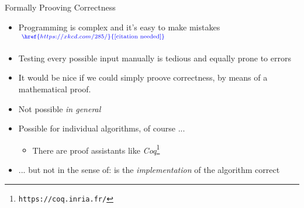 
\begin{frame}[fragile]{Formally Prooving Correctness}
%
\begin{itemize}
\item Programming is complex and it's easy to make mistakes$\phantom{.}^{\color{blue}\href{https://xkcd.com/285/}{\text{[citation needed]}}}$
\item Testing every possible input manually is tedious and equally prone to errors
\item[\Thus] It would be nice if we could simply proove correctness, \zB by means of a mathematical proof.
\pause
\item Not possible \emph{in general}
\item Possible for individual algorithms, of course ...
	\begin{itemize}
	\item There are proof assistants like \emph{Coq}\footnote{\texttt{https://coq.inria.fr/}}
	\end{itemize}
\item ... but not in the sense of: is the \emph{implementation} of the algorithm correct
\end{itemize}
%
\end{frame}


